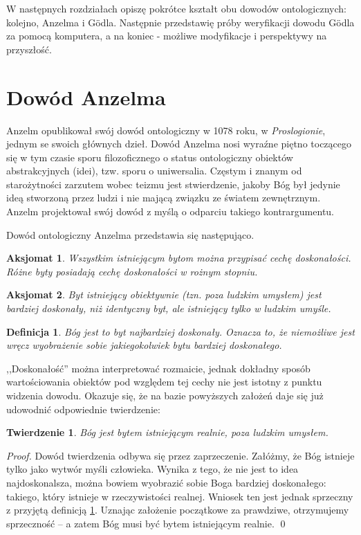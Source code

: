 \documentclass[
	runningheads
]{llncs}
\newtheorem{theorem-pl}{Twierdzenie}
\newtheorem{definition-pl}{Definicja}
\newtheorem{axiom-pl}{Aksjomat}
\begin{document}
W następnych rozdziałach opiszę pokrótce kształt obu dowodów ontologicznych: kolejno, Anzelma i G\"odla. Następnie przedstawię próby weryfikacji dowodu G\"odla za pomocą komputera, a na koniec - możliwe modyfikacje i perspektywy na przyszłość. 

\section{Dowód Anzelma} \label{sec:dowod-anzelma}
Anzelm opublikował swój dowód ontologiczny w 1078 roku, w \textit{Proslogionie}, jednym se swoich głównych dzieł. Dowód Anzelma nosi wyraźne piętno toczącego się w tym czasie sporu filozoficznego o status ontologiczny obiektów abstrakcyjnych (idei), tzw. sporu o uniwersalia. Częstym i znanym od starożytności zarzutem wobec teizmu jest stwierdzenie, jakoby Bóg był jedynie ideą stworzoną przez ludzi i nie mającą związku ze światem zewnętrznym. Anzelm projektował swój dowód z myślą o odparciu takiego kontrargumentu. 

Dowód ontologiczny Anzelma przedstawia się następująco. 
\begin{axiom-pl} \label{axiom:anzelm1}
	Wszystkim istniejącym bytom można przypisać cechę \emph{doskonałości}. Różne byty posiadają cechę doskonałości w rożnym stopniu. 
\end{axiom-pl}
\begin{axiom-pl} \label{axiom:anzelm2}
	Byt istniejący obiektywnie (tzn. poza ludzkim umysłem) jest bardziej doskonały, niż identyczny byt, ale istniejący tylko w ludzkim umyśle. 
\end{axiom-pl}
\begin{definition-pl} \label{def:anzelm-god}
	Bóg jest to byt najbardziej doskonały. Oznacza to, że niemożliwe jest wręcz \emph{wyobrażenie sobie} jakiegokolwiek bytu bardziej doskonałego. 
\end{definition-pl}
\noindent,,Doskonałość'' można interpretować rozmaicie, jednak dokładny sposób wartościowania obiektów pod względem tej cechy nie jest istotny z punktu widzenia dowodu. Okazuje się, że na bazie powyższych założeń daje się już udowodnić odpowiednie twierdzenie:
\begin{theorem-pl} \label{theorem:anzelm-god}
	Bóg jest bytem istniejącym realnie, poza ludzkim umysłem. 
\end{theorem-pl}
\begin{proof}
	Dowód twierdzenia odbywa się przez zaprzeczenie. Załóżmy, że Bóg istnieje tylko jako wytwór myśli człowieka. Wynika z tego, że nie jest to idea najdoskonalsza, można bowiem wyobrazić sobie Boga bardziej doskonałego: takiego, który istnieje w rzeczywistości realnej. Wniosek ten jest jednak sprzeczny z przyjętą definicją \ref{def:anzelm-god}. Uznając założenie początkowe za prawdziwe, otrzymujemy sprzeczność -- a zatem Bóg musi być bytem istniejącym realnie. 
	\qed
\end{proof}
\end{document}
